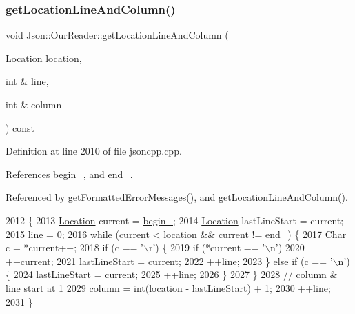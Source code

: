 \subsubsection{\texorpdfstring{get\+Location\+Line\+And\+Column()}{getLocationLineAndColumn()}\hspace{0.1cm}{\footnotesize\ttfamily [1/2]}}
{\footnotesize\ttfamily void Json\+::\+Our\+Reader\+::get\+Location\+Line\+And\+Column (\begin{DoxyParamCaption}\item[{\hyperlink{class_json_1_1_our_reader_a1bdc7bbc52ba87cae6b19746f2ee0189}{Location}}]{location,  }\item[{int \&}]{line,  }\item[{int \&}]{column }\end{DoxyParamCaption}) const\hspace{0.3cm}{\ttfamily [private]}}



Definition at line 2010 of file jsoncpp.\+cpp.



References begin\+\_\+, and end\+\_\+.



Referenced by get\+Formatted\+Error\+Messages(), and get\+Location\+Line\+And\+Column().


\begin{DoxyCode}
2012                                                          \{
2013   \hyperlink{class_json_1_1_our_reader_a1bdc7bbc52ba87cae6b19746f2ee0189}{Location} current = \hyperlink{class_json_1_1_our_reader_a9bda9d72335d52cd06e65f9eca3f70f5}{begin\_};
2014   \hyperlink{class_json_1_1_our_reader_a1bdc7bbc52ba87cae6b19746f2ee0189}{Location} lastLineStart = current;
2015   line = 0;
2016   \textcolor{keywordflow}{while} (current < location && current != \hyperlink{class_json_1_1_our_reader_ab1f69b0260c27a0d2d65dc56e42c8f9d}{end\_}) \{
2017     \hyperlink{class_json_1_1_our_reader_a0cd0bab4caa66594ab843ccd5f9dc239}{Char} c = *current++;
2018     \textcolor{keywordflow}{if} (c == \textcolor{charliteral}{'\(\backslash\)r'}) \{
2019       \textcolor{keywordflow}{if} (*current == \textcolor{charliteral}{'\(\backslash\)n'})
2020         ++current;
2021       lastLineStart = current;
2022       ++line;
2023     \} \textcolor{keywordflow}{else} \textcolor{keywordflow}{if} (c == \textcolor{charliteral}{'\(\backslash\)n'}) \{
2024       lastLineStart = current;
2025       ++line;
2026     \}
2027   \}
2028   \textcolor{comment}{// column & line start at 1}
2029   column = int(location - lastLineStart) + 1;
2030   ++line;
2031 \}
\end{DoxyCode}
\mbox{\label{class_json_1_1_our_reader_ac129e94cdc260822b2fd24e2ca35e636}} 
